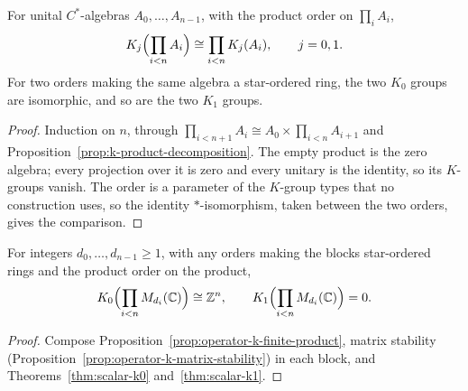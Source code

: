 \begin{proposition}\label{prop:operator-k-finite-product}
\leanok
For unital $C^*$-algebras $A_0,\dots,A_{n-1}$, with the product order on
$\prod_i A_i$,
\[
 K_j\Bigl(\prod_{i<n}A_i\Bigr)\cong\prod_{i<n}K_j(A_i),\qquad j=0,1.
\]
For two orders making the same algebra a star-ordered ring, the two $K_0$
groups are isomorphic, and so are the two $K_1$ groups.
\end{proposition}
\begin{proof}
\leanok
Induction on $n$, through $\prod_{i<n+1}A_i\cong A_0\times\prod_{i<n}A_{i+1}$
and Proposition~\ref{prop:k-product-decomposition}. The empty product is the
zero algebra; every projection over it is zero and every unitary is the
identity, so its $K$-groups vanish. The order is a parameter of the $K$-group
types that no construction uses, so the identity $*$-isomorphism, taken between
the two orders, gives the comparison.
\end{proof}

\begin{corollary}\label{cor:matrix-block-k-groups}
\leanok
For integers $d_0,\dots,d_{n-1}\ge1$, with any orders making the blocks
star-ordered rings and the product order on the product,
\[
 K_0\Bigl(\prod_{i<n}M_{d_i}(\mathbb C)\Bigr)\cong\mathbb Z^n,\qquad
 K_1\Bigl(\prod_{i<n}M_{d_i}(\mathbb C)\Bigr)=0.
\]
\end{corollary}
\begin{proof}
\leanok
Compose Proposition~\ref{prop:operator-k-finite-product}, matrix stability
(Proposition~\ref{prop:operator-k-matrix-stability}) in each block, and
Theorems~\ref{thm:scalar-k0} and~\ref{thm:scalar-k1}.
\end{proof}


